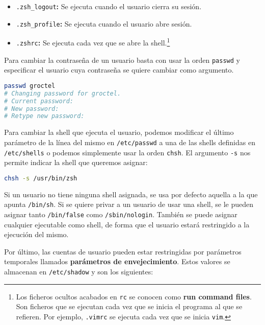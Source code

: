 \begin{itemize}
\item\texttt{.zsh\_logout}\textbf{:} Se ejecuta cuando el usuario cierra su sesión.
\item\texttt{.zsh\_profile}\textbf{:} Se ejecuta cuando el usuario abre sesión.
\item\texttt{.zshrc}\textbf{:} Se ejecuta cada vez que se abre la shell.\footnote{Los ficheros ocultos acabados en \texttt{rc} se conocen como \textbf{run command files}. Son ficheros que se ejecutan cada vez que se inicia el programa al que se refieren. Por ejemplo, \texttt{.vimrc} se ejecuta cada vez que se inicia \texttt{vim}.}
\end{itemize}

Para cambiar la contraseña de un usuario basta con usar la orden \texttt{passwd} y especificar el usuario cuya contraseña se quiere cambiar como argumento.

\begin{lstlisting}[language=Bash]
passwd groctel
# Changing password for groctel.
# Current password:
# New password:
# Retype new password:
\end{lstlisting}

Para cambiar la shell que ejecuta el usuario, podemos modificar el último parámetro de la línea del mismo en \texttt{/etc/passwd} a una de las shells definidas en \texttt{/etc/shells} o podemos simplemente usar la orden \texttt{chsh}.
El argumento \texttt{-s} nos permite indicar la shell que queremos asignar:

\begin{lstlisting}[language=Bash]
chsh -s /usr/bin/zsh
\end{lstlisting}

Si un usuario no tiene ninguna shell asignada, se usa por defecto aquella a la que apunta \texttt{/bin/sh}.
Si se quiere privar a un usuario de usar una shell, se le pueden asignar tanto \texttt{/bin/false} como \texttt{/sbin/nologin}.
También se puede asignar cualquier ejecutable como shell, de forma que el usuario estará restringido a la ejecución del mismo.

Por último, las cuentas de usuario pueden estar restringidas por parámetros temporales llamados \textbf{parámetros de envejecimiento}.
Estos valores se almacenan en \texttt{/etc/shadow} y son los siguientes:

